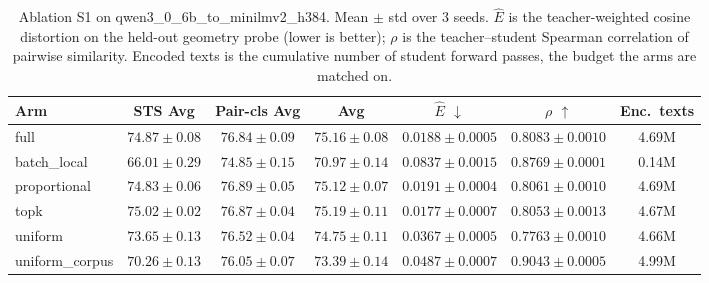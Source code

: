 \begin{table}[t]
\centering
\caption{Ablation S1 on qwen3\_0\_6b\_to\_minilmv2\_h384. Mean $\pm$ std over 3 seeds. $\hat{E}$ is the teacher-weighted cosine distortion on the held-out geometry probe (lower is better); $\rho$ is the teacher--student Spearman correlation of pairwise similarity. Encoded texts is the cumulative number of student forward passes, the budget the arms are matched on.}
\label{tab:ablation_s1_qwen3_0_6b_to_minilmv2_h384}
\begin{tabular}{lcccccc}
\toprule
Arm & STS Avg & Pair-cls Avg & Avg & $\hat{E}$ $\downarrow$ & $\rho$ $\uparrow$ & Enc.\ texts \\
\midrule
full & $74.87 \pm 0.08$ & $76.84 \pm 0.09$ & $75.16 \pm 0.08$ & $0.0188 \pm 0.0005$ & $0.8083 \pm 0.0010$ & 4.69M \\
batch\_local & $66.01 \pm 0.29$ & $74.85 \pm 0.15$ & $70.97 \pm 0.14$ & $0.0837 \pm 0.0015$ & $0.8769 \pm 0.0001$ & 0.14M \\
proportional & $74.83 \pm 0.06$ & $76.89 \pm 0.05$ & $75.12 \pm 0.07$ & $0.0191 \pm 0.0004$ & $0.8061 \pm 0.0010$ & 4.69M \\
topk & $75.02 \pm 0.02$ & $76.87 \pm 0.04$ & $75.19 \pm 0.11$ & $0.0177 \pm 0.0007$ & $0.8053 \pm 0.0013$ & 4.67M \\
uniform & $73.65 \pm 0.13$ & $76.52 \pm 0.04$ & $74.75 \pm 0.11$ & $0.0367 \pm 0.0005$ & $0.7763 \pm 0.0010$ & 4.66M \\
uniform\_corpus & $70.26 \pm 0.13$ & $76.05 \pm 0.07$ & $73.39 \pm 0.14$ & $0.0487 \pm 0.0007$ & $0.9043 \pm 0.0005$ & 4.99M \\
\bottomrule
\end{tabular}
\end{table}
